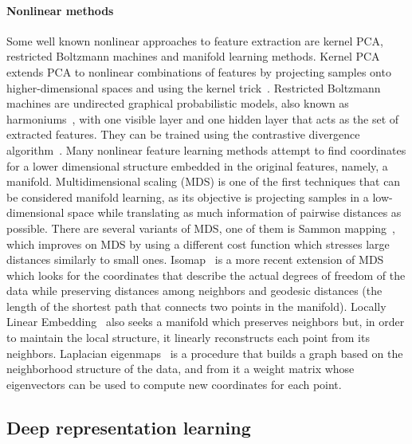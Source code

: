 \paragraph{Nonlinear methods} Some well known nonlinear approaches to feature extraction are kernel PCA, restricted Boltzmann machines and manifold learning methods. Kernel PCA~ extends PCA to nonlinear combinations of features by projecting samples onto higher-dimensional spaces and using the kernel trick~. Restricted Boltzmann machines are undirected graphical probabilistic models, also known as harmoniums~, with one visible layer and one hidden layer that acts as the set of extracted features. They can be trained using the contrastive divergence algorithm~. Many nonlinear feature learning methods attempt to find coordinates for a lower dimensional structure embedded in the original features, namely, a manifold. Multidimensional scaling (MDS) is one of the first techniques that can be considered manifold learning, as its objective is projecting samples in a low-dimensional space while translating as much information of pairwise distances as possible. There are several variants of MDS, one of them is Sammon mapping~, which improves on MDS by using a different cost function which stresses large distances similarly to small ones. Isomap~ is a more recent extension of MDS which looks for the coordinates that describe the actual degrees of freedom of the data while preserving distances among neighbors and geodesic distances (the length of the shortest path that connects two points in the manifold). Locally Linear Embedding~ also seeks a manifold which preserves neighbors but, in order to maintain the local structure, it linearly reconstructs each point from its neighbors. Laplacian eigenmaps~ is a procedure that builds a graph based on the neighborhood structure of the data, and from it a weight matrix whose eigenvectors can be used to compute new coordinates for each point.

\subsection{Deep representation learning}


